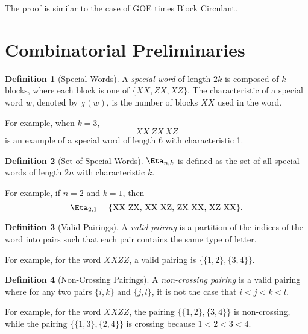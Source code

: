\documentclass[12pt,reqno]{amsart}
\theoremstyle{plain} %
\theoremstyle{remark}
\theoremstyle{definition}
\newtheorem*{defn}{Definition}
\begin{document}
The proof is similar to the case of GOE times Block Circulant. 


\section{Combinatorial Preliminaries}

\begin{defn}[Special Words]
A \textit{special word} of length \(2k\) is composed of \(k\) blocks, where each block is one of \(\{XX, ZX, XZ\}\). The characteristic of a special word \(w\), denoted by \(\chi(w)\), is the number of blocks \(XX\) used in the word.

For example, when \(k = 3\),
\[
XX \, ZX \, XZ
\]
is an example of a special word of length 6 with characteristic 1.
\end{defn}

\begin{defn}[Set of Special Words]
\(\Eta_{n, k}\) is defined as the set of all special words of length \(2n\) with characteristic \(k\).

For example, if \(n = 2\) and \(k = 1\), then
\[
\Eta_{2, 1} = \{\text{XX ZX}, \, \text{XX XZ}, \, \text{ZX XX}, \, \text{XZ XX}\}.
\]
\end{defn}

\begin{defn}[Valid Pairings]
A \textit{valid pairing} is a partition of the indices of the word into pairs such that each pair contains the same type of letter.

For example, for the word \(XXZZ\), a valid pairing is \(\{\{1, 2\}, \{3, 4\}\}\).
\end{defn}

\begin{defn}[Non-Crossing Pairings]
A \textit{non-crossing pairing} is a valid pairing where for any two pairs \(\{i, k\}\) and \(\{j, l\}\), it is not the case that \(i < j < k < l\).

For example, for the word \(XXZZ\), the pairing \(\{\{1, 2\}, \{3, 4\}\}\) is non-crossing, while the pairing \(\{\{1, 3\}, \{2, 4\}\}\) is crossing because \(1 < 2 < 3 < 4\).
\end{defn}
\end{document}
